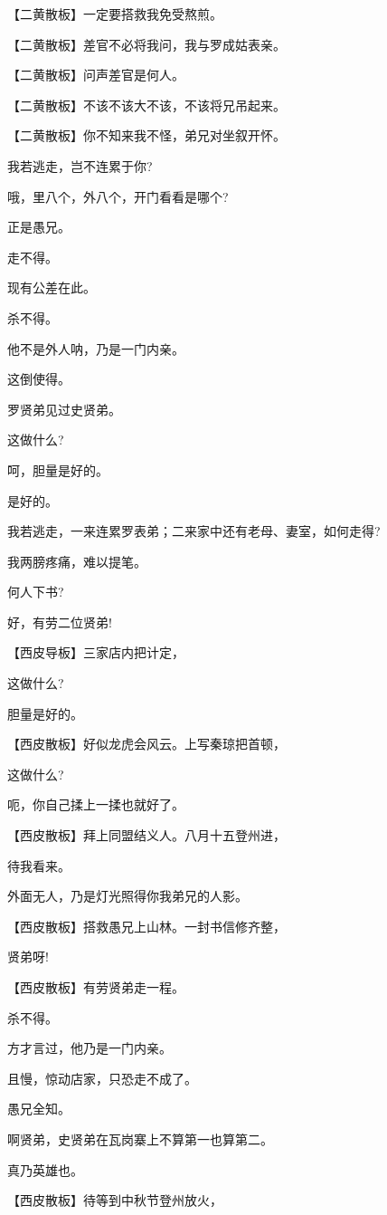 【二黄散板】一定要搭救我免受熬煎。

【二黄散板】差官不必将我问，我与罗成姑表亲。

【二黄散板】问声差官是何人。

【二黄散板】不该不该大不该，不该将兄吊起来。

【二黄散板】你不知来我不怪，弟兄对坐叙开怀。

我若逃走，岂不连累于你?

哦，里八个，外八个，开门看看是哪个?

正是愚兄。

走不得。

现有公差在此。

杀不得。

他不是外人呐，乃是一门内亲。

这倒使得。

罗贤弟见过史贤弟。

这做什么?

呵，胆量是好的。

是好的。

我若逃走，一来连累罗表弟；二来家中还有老母、妻室，如何走得?

我两膀疼痛，难以提笔。

何人下书?

好，有劳二位贤弟!

【西皮导板】三家店内把计定，

这做什么?

胆量是好的。

【西皮散板】好似龙虎会风云。上写秦琼把首顿，

这做什么?

呃，你自己揉上一揉也就好了。

【西皮散板】拜上同盟结义人。八月十五登州进，

待我看来。

外面无人，乃是灯光照得你我弟兄的人影。

【西皮散板】搭救愚兄上山林。一封书信修齐整，

贤弟呀!

【西皮散板】有劳贤弟走一程。

杀不得。

方才言过，他乃是一门内亲。

且慢，惊动店家，只恐走不成了。

愚兄全知。

啊贤弟，史贤弟在瓦岗寨上不算第一也算第二。

真乃英雄也。

【西皮散板】待等到中秋节登州放火，

